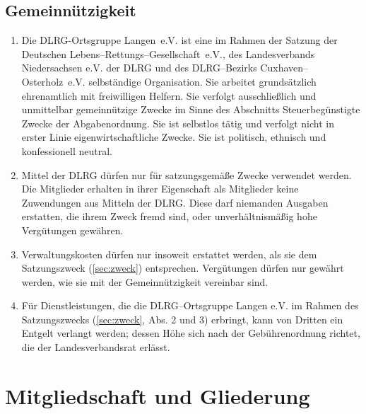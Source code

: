 \documentclass[%
12pt, %
a4paper, %
headsepline, %
parskip, %
headings=normal, %
]{scrreprt}
\begin{document}
\section{Gemeinnützigkeit}
\label{sec:gemeinnuetzigkeit}
\begin{enumerate}
    \item Die DLRG-Ortsgruppe Langen~e.V. ist eine im Rahmen der Satzung der Deutschen Lebens--Rettungs--Gesellschaft~e.V., des Landesverbands Niedersachsen e.V. der DLRG und des DLRG--Bezirks Cuxhaven--Osterholz~e.V. selbständige Organisation. Sie arbeitet grundsätzlich ehrenamtlich mit freiwilligen Helfern. Sie verfolgt ausschließlich und unmittelbar gemeinnützige Zwecke im Sinne des Abschnitts \glqq{}Steuerbegünstigte Zwecke\grqq{} der Abgabenordnung. Sie ist selbstlos tätig und verfolgt nicht in erster Linie eigenwirtschaftliche Zwecke. Sie ist politisch, ethnisch und konfessionell neutral.
    \item Mittel der DLRG dürfen nur für satzungsgemäße Zwecke verwendet werden. Die Mitglieder erhalten in ihrer Eigenschaft als Mitglieder keine Zuwendungen aus Mitteln der DLRG. Diese darf niemanden Ausgaben erstatten, die ihrem Zweck fremd sind, oder unverhältnismäßig hohe Vergütungen gewähren.
    \item Verwaltungskosten dürfen nur insoweit erstattet werden, als sie dem Satzungszweck (\ref{sec:zweck}) entsprechen. Vergütungen dürfen nur gewährt werden, wie sie mit der Gemeinnützigkeit vereinbar sind.
    \item Für Dienstleistungen, die die DLRG--Ortsgruppe Langen e.V. im Rahmen des Satzungszwecks (\ref{sec:zweck}, Abs. 2 und 3) erbringt, kann von Dritten ein Entgelt verlangt werden; dessen Höhe sich nach der Gebührenordnung richtet, die der Landesverbandsrat erlässt.
\end{enumerate}

\chapter{Mitgliedschaft und Gliederung}
\setcounter{section}{3}
\end{document}
